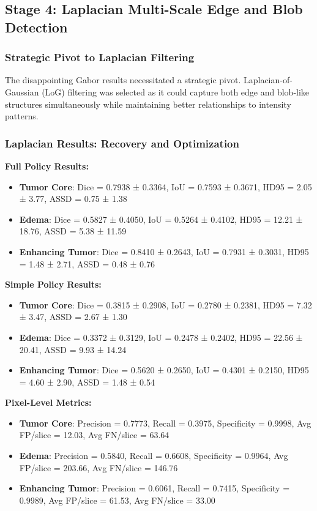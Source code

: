 \subsection{Stage 4: Laplacian Multi-Scale Edge and Blob Detection}

\subsubsection{Strategic Pivot to Laplacian Filtering}

The disappointing Gabor results necessitated a strategic pivot. Laplacian-of-Gaussian (LoG) filtering was selected as it could capture both edge and blob-like structures simultaneously while maintaining better relationships to intensity patterns.

\subsubsection{Laplacian Results: Recovery and Optimization}

\textbf{Full Policy Results:}
\begin{itemize}
    \item \textbf{Tumor Core}: Dice = 0.7938 ± 0.3364, IoU = 0.7593 ± 0.3671, HD95 = 2.05 ± 3.77, ASSD = 0.75 ± 1.38
    \item \textbf{Edema}: Dice = 0.5827 ± 0.4050, IoU = 0.5264 ± 0.4102, HD95 = 12.21 ± 18.76, ASSD = 5.38 ± 11.59
    \item \textbf{Enhancing Tumor}: Dice = 0.8410 ± 0.2643, IoU = 0.7931 ± 0.3031, HD95 = 1.48 ± 2.71, ASSD = 0.48 ± 0.76
\end{itemize}

\textbf{Simple Policy Results:}
\begin{itemize}
    \item \textbf{Tumor Core}: Dice = 0.3815 ± 0.2908, IoU = 0.2780 ± 0.2381, HD95 = 7.32 ± 3.47, ASSD = 2.67 ± 1.30
    \item \textbf{Edema}: Dice = 0.3372 ± 0.3129, IoU = 0.2478 ± 0.2402, HD95 = 22.56 ± 20.41, ASSD = 9.93 ± 14.24
    \item \textbf{Enhancing Tumor}: Dice = 0.5620 ± 0.2650, IoU = 0.4301 ± 0.2150, HD95 = 4.60 ± 2.90, ASSD = 1.48 ± 0.54
\end{itemize}

\textbf{Pixel-Level Metrics:}
\begin{itemize}
    \item \textbf{Tumor Core}: Precision = 0.7773, Recall = 0.3975, Specificity = 0.9998, Avg FP/slice = 12.03, Avg FN/slice = 63.64
    \item \textbf{Edema}: Precision = 0.5840, Recall = 0.6608, Specificity = 0.9964, Avg FP/slice = 203.66, Avg FN/slice = 146.76
    \item \textbf{Enhancing Tumor}: Precision = 0.6061, Recall = 0.7415, Specificity = 0.9989, Avg FP/slice = 61.53, Avg FN/slice = 33.00
\end{itemize}

